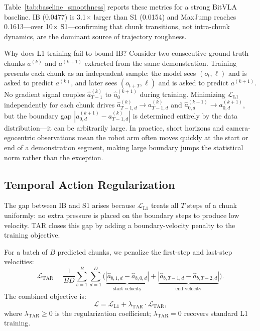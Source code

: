 Table~\ref{tab:baseline_smoothness} reports these metrics for a strong BitVLA baseline. IB (0.0477) is 3.1$\times$ larger than S1 (0.0154) and MaxJump reaches 0.1613---over 10$\times$ S1---confirming that chunk transitions, not intra-chunk dynamics, are the dominant source of trajectory roughness.



Why does L1 training fail to bound IB? Consider two consecutive ground-truth chunks $a^{(k)}$ and $a^{(k+1)}$ extracted from the same demonstration. Training presents each chunk as an independent sample: the model sees $(o_t, \ell)$ and is asked to predict $a^{(k)}$, and later sees $(o_{t+T}, \ell)$ and is asked to predict $a^{(k+1)}$. No gradient signal couples $\hat{a}^{(k)}_{T-1}$ to $\hat{a}^{(k+1)}_{0}$ during training. Minimizing $\mathcal{L}_{\text{L1}}$ independently for each chunk drives $\hat{a}^{(k)}_{T-1,d} \rightarrow a^{(k)}_{T-1,d}$ and $\hat{a}^{(k+1)}_{0,d} \rightarrow a^{(k+1)}_{0,d}$, but the boundary gap $|a^{(k+1)}_{0,d} - a^{(k)}_{T-1,d}|$ is determined entirely by the data distribution---it can be arbitrarily large. In practice, short horizons and camera-egocentric observations mean the robot arm often moves quickly at the start or end of a demonstration segment, making large boundary jumps the statistical norm rather than the exception.

\subsection{Temporal Action Regularization}
The gap between IB and S1 arises because $\mathcal{L}_{\text{L1}}$ treats all $T$ steps of a chunk uniformly: no extra pressure is placed on the boundary steps to produce low velocity. TAR closes this gap by adding a boundary-velocity penalty to the training objective.

For a batch of $B$ predicted chunks, we penalize the first-step and last-step velocities:
\begin{equation}
    \mathcal{L}_{\text{TAR}} = \frac{1}{BD} \sum_{b=1}^{B} \sum_{d=1}^{D} \Big( \underbrace{|\hat{a}_{b,1,d} - \hat{a}_{b,0,d}|}_{\text{start velocity}} + \underbrace{|\hat{a}_{b,T-1,d} - \hat{a}_{b,T-2,d}|}_{\text{end velocity}} \Big).
    \label{eq:tar}
\end{equation}
The combined objective is:
\begin{equation}
    \mathcal{L} = \mathcal{L}_{\text{L1}} + \lambda_{\text{TAR}} \cdot \mathcal{L}_{\text{TAR}},
    \label{eq:total}
\end{equation}
where $\lambda_{\text{TAR}} \geq 0$ is the regularization coefficient; $\lambda_{\text{TAR}}=0$ recovers standard L1 training.

